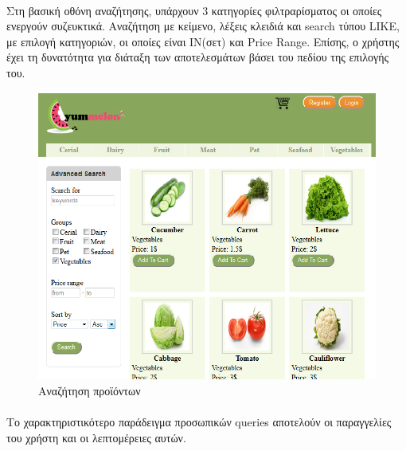 \documentclass[12pt]{article}
\begin{document}
  	  	 
  	  \paragraph{}
  	  	 Στη βασική οθόνη αναζήτησης, υπάρχουν 3 κατηγορίες φιλτραρίσματος οι οποίες ενεργούν συζευκτικά.
  	  	 Αναζήτηση με κείμενο, λέξεις κλειδιά και search τύπου LIKE, με επιλογή κατηγοριών, οι οποίες είναι ΙΝ(σετ) και Price Range.
  	  	 Επίσης, ο χρήστης έχει τη δυνατότητα για διάταξη των αποτελεσμάτων βάσει του πεδίου της επιλογής του.
  	  	 
		\begin{figure}[H]
			\centering
			\includegraphics[width=1\textwidth]{searchImages}
			\caption{Αναζήτηση προϊόντων}
		\end{figure}
  	  	 
  	  \paragraph{}
  	  	 Το χαρακτηριστικότερο παράδειγμα προσωπικών queries αποτελούν οι παραγγελίες του χρήστη και οι λεπτομέρειες αυτών.
  	  	 
\end{document}
